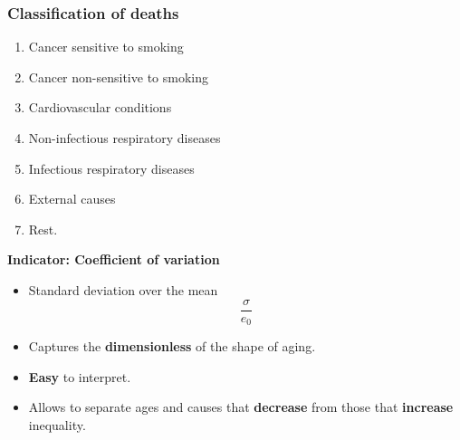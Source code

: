 \documentclass[xcolor={dvipsnames}]{beamer}
\begin{document}
\begin{frame}\frametitle{Classification of deaths}
\Large{

		\begin{enumerate}
		
		
\color{blue} 		\item Cancer sensitive to smoking

\color{green}		\item Cancer non-sensitive to smoking
		
\color{ForestGreen}	\item Cardiovascular conditions
		
\color{orange}		\item Non-infectious respiratory diseases
		
\color{Orange}	    \item Infectious respiratory diseases

\color{Red}	       \item External causes
		
\color{gray}       \item Rest.

		
		\end{enumerate}			

}
\end{frame}




%



\begin{frame}
\Large{
\textbf{Indicator: Coefficient of variation}
\pause
\begin{itemize}
\item Standard deviation over the mean
\begin{equation*}
\frac{\sigma}{e_0}
\end{equation*}
\item Captures the \textbf{dimensionless} of the shape of aging.
\pause
\item \textbf{Easy} to interpret.
\pause
\item Allows to separate ages and causes that \textbf{decrease} from those that \textbf{increase} inequality.
\end{itemize}

}
\end{frame}
\end{document}
